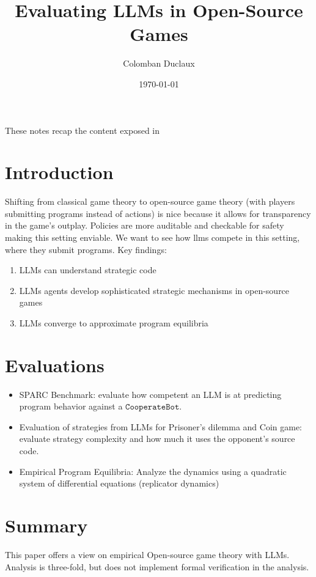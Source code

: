 \documentclass{article}
\title{Evaluating LLMs in Open-Source Games}
\author{Colomban Duclaux}
\date{\today}
\begin{document}
\maketitle
These notes recap the content exposed in \cite{sistla2025evaluatingllmsopensourcegames}

\section{Introduction}
Shifting from classical game theory to open-source game theory (with players submitting programs instead of actions) is nice because it allows for transparency in the game's outplay. Policies are more auditable and checkable for safety making this setting enviable.
We want to see how llms compete in this setting, where they submit programs.
Key findings: \begin{enumerate}
    \item LLMs can understand strategic code
    \item LLMs agents develop sophisticated strategic mechanisms in open-source games
    \item LLMs converge to approximate program equilibria
\end{enumerate}

\section{Evaluations}
\begin{itemize}
    \item SPARC Benchmark: evaluate how competent an LLM is at predicting program behavior against a $\texttt{CooperateBot}$.
    \item Evaluation of strategies from LLMs for Prisoner's dilemma and Coin game: evaluate strategy complexity and how much it uses the opponent's source code.
    \item Empirical Program Equilibria: Analyze the dynamics using a quadratic system of differential equations (replicator dynamics)
\end{itemize}

\section{Summary}
This paper offers a view on empirical Open-source game theory with LLMs. Analysis is three-fold, but does not implement formal verification in the analysis.

\printbibliography
\end{document}
